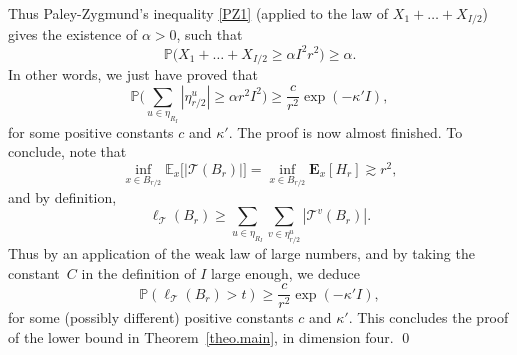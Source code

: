 \documentclass[11pt]{article}
\numberwithin{equation}{section}
\let\ts\textstyle
\theoremstyle{plain}
\theoremstyle{definition}
\newcommand\T{\mathcal{T}}
\newcommand{\1}{{\text{\Large $\mathfrak 1$}}}
\begin{document}
Thus Paley-Zygmund's inequality \eqref{PZ1} (applied to the law of $X_1+\dots + X_{I/2}$) gives the existence of $\alpha>0$, such that
\[
\mathbb P\big(X_1+\dots + X_{I/2} \ge \alpha I^2r^2\big) \ge \alpha.
\]
In other words, we just have proved that
\[
\mathbb P\big(\ts\sum_{u\in \eta_{R_I}}
|\eta^u_{r/2}|\ge \alpha r^2 I^2\big)\ge \dfrac{c}{r^2}\exp(-\kappa' I),
\]
for some positive constants $c$ and $\kappa'$. The proof is now almost finished. To conclude, note that
\[
\inf_{x\in B_{r/2}}\mathbb E_x\big[|\mathcal T(B_r)|\big] =
\inf_{x\in B_{r/2}} \mathbf E_x[H_r] \gtrsim r^2,
\]
and by definition,
\[
\ell_{\T}(B_r) \ge \sum_{u \in \eta_{R_I} }
\sum_{v \in \eta^u_{r/2} } |\mathcal T^v(B_r)|.
\]
Thus by an application of the weak law of large numbers, and by taking the constant~$C$ in the definition of $I$ large enough, we deduce
\[
\mathbb P(\ell_{\T}(B_r)>t) \geq \frac{c}{r^2} \exp(- \kappa' I),
\]
for some (possibly different) positive constants $c$ and $\kappa'$. This concludes the proof of the lower bound in Theorem~\ref{theo.main}, in dimension four. \qed
\end{document}
